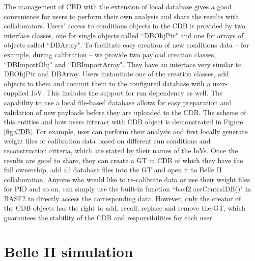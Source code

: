 The management of CBD with the extension of local database gives a good convenience for users to perform their own analysis and share the results with collaborators.
Users' access to conditions objects in the CDB is
provided by two interface classes, one for single objects
called ``DBObjPtr" and one for arrays of objects called
``DBArray". To facilitate easy creation of new conditions data – for example, during calibration – we provide two payload creation classes, ``DBImportObj" and ``DBImportArray". They
have an interface very similar to DBObjPtr and DBArray\cite{BASF2}.
Users instantiate one of the creation classes, add objects
 to them and commit them to the configured database with a user-supplied IoV. This includes the support for run dependency as well. The capability to use a local file-based
 database allows for easy preparation and validation of
new payloads before they are uploaded to the CDB. The scheme of this entities and how users interact with CDB object is demonstrated in Figure \ref{fig:CDB}. For example, user can perform their analysis and first locally generate weight files or calibration data based on different run conditions and reconstruction criteria, which are stated by their names of the IoVs. Once the results are good to share, they can create a GT in CDB of which they have the full ownership, add all database files into the GT and open it to Belle II collaboration. Anyone who would like to re-calibrate data or use their weight files for PID and so on, can simply use the built-in function ``basf2.useCentralDB()" in BASF2 to directly access the corresponding data. However, only the creator of the CDB objects has the right to add, recall, replace and remove the GT, which guarantees the stability of the CDB and responsibilities for each user.


\begin{comment}
\subsection{Summary}
BASF2 has been developed for an emphasis on providing reliable and high quality performance for Belle II analysis. It satisfies the most of demanding requirements of data taking, simulation, reconstruction, and offline analysis. 
\end{comment}

\section{Belle II simulation}

